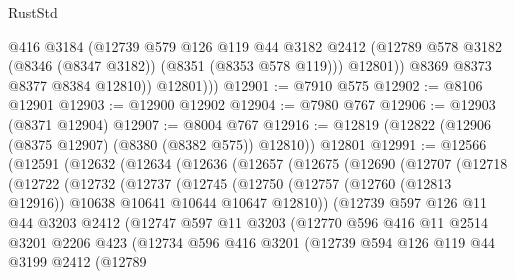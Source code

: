 \begin{lexlean}{RustStd}
\begin{coremodule}
                @416
                @3184
                (@12739
                  @579
                  @126
                  @119
                  @44
                  @3182
                  @2412
                  (@12789 @578 @3182 (@8346 (@8347 @3182)) (@8351 (@8353 @578 @119)))
                  @12801))
              @8369
              @8373
              @8377
              @8384
              @12810))
          @12801)))
@12901 := @7910 @575
@12902 := @8106 @12901
@12903 := @12900 @12902
@12904 := @7980 @767
@12906 := @12903 (@8371 @12904)
@12907 := @8004 @767
@12916 := @12819 (@12822 (@12906 (@8375 @12907) (@8380 (@8382 @575)) @12810)) @12801
@12991 := @12566
    (@12591
      (@12632
        (@12634
          (@12636
            (@12657
              (@12675
                (@12690
                  (@12707
                    (@12718
                      (@12722
                        (@12732
                          (@12737
                            (@12745
                              (@12750
                                (@12757
                                  (@12760 (@12813 @12916))
                                  @10638
                                  @10641
                                  @10644
                                  @10647
                                  @12810))
                              (@12739
                                @597
                                @126
                                @11
                                @44
                                @3203
                                @2412
                                (@12747
                                  @597
                                  @11
                                  @3203
                                  (@12770
                                    @596
                                    @416
                                    @11
                                    @2514
                                    @3201
                                    @2206
                                    @423
                                    (@12734
                                      @596
                                      @416
                                      @3201
                                      (@12739
                                        @594
                                        @126
                                        @119
                                        @44
                                        @3199
                                        @2412
                                        (@12789

\end{coremodule}
\end{lexlean}
